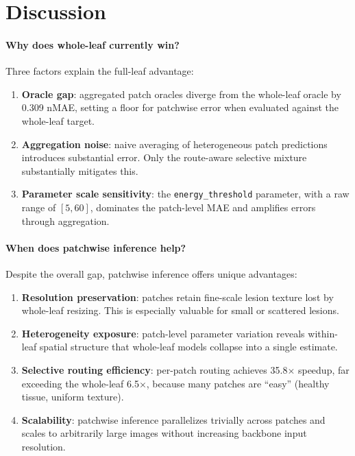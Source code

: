 \documentclass[11pt]{article}
\begin{document}
\section{Discussion}
\label{sec:discussion}

\paragraph{Why does whole-leaf currently win?}
Three factors explain the full-leaf advantage:
\begin{enumerate}[leftmargin=1.5em,itemsep=1pt]
\item \textbf{Oracle gap}: aggregated patch oracles diverge from the whole-leaf oracle by 0.309 nMAE, setting a floor for patchwise error when evaluated against the whole-leaf target.
\item \textbf{Aggregation noise}: naive averaging of heterogeneous patch predictions introduces substantial error.  Only the route-aware selective mixture substantially mitigates this.
\item \textbf{Parameter scale sensitivity}: the \texttt{energy\_threshold} parameter, with a raw range of $[5, 60]$, dominates the patch-level MAE and amplifies errors through aggregation.
\end{enumerate}

\paragraph{When does patchwise inference help?}
Despite the overall gap, patchwise inference offers unique advantages:
\begin{enumerate}[leftmargin=1.5em,itemsep=1pt]
\item \textbf{Resolution preservation}: patches retain fine-scale lesion texture lost by whole-leaf resizing.  This is especially valuable for small or scattered lesions.
\item \textbf{Heterogeneity exposure}: patch-level parameter variation reveals within-leaf spatial structure that whole-leaf models collapse into a single estimate.
\item \textbf{Selective routing efficiency}: per-patch routing achieves 35.8$\times$ speedup, far exceeding the whole-leaf 6.5$\times$, because many patches are ``easy'' (healthy tissue, uniform texture).
\item \textbf{Scalability}: patchwise inference parallelizes trivially across patches and scales to arbitrarily large images without increasing backbone input resolution.
\end{enumerate}
\end{document}
